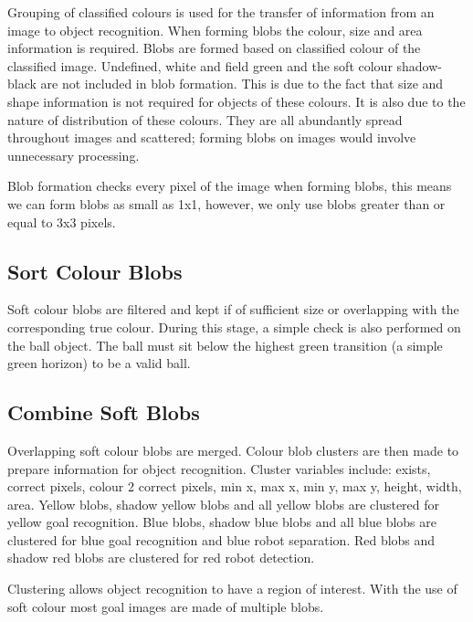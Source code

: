 Grouping of classified colours is used for the transfer of information from an image to object recognition. When forming blobs the colour, size and area information is required. Blobs are formed based on classified colour of the classified image. Undefined, white and field green and the soft colour shadow-black are not included in blob formation. This is due to the fact that size and shape information is not required for objects of these colours. It is also due to the nature of distribution of these colours. They are all abundantly spread throughout images and scattered; forming blobs on images would involve unnecessary processing. 

Blob formation checks every pixel of the image when forming blobs, this means we can form blobs as small as 1x1, however, we only use blobs greater than or equal to 3x3 pixels. 

\subsection{Sort Colour Blobs}

Soft colour blobs are filtered and kept if of sufficient size or overlapping with the corresponding true colour. During this stage, a simple check is also performed on the ball object. The ball must sit below the highest green transition (a simple green horizon) to be a valid ball.

\subsection{Combine Soft Blobs}

Overlapping soft colour blobs are merged. Colour blob clusters are then made to prepare information for object recognition. Cluster variables include: exists, correct pixels, colour 2 correct pixels, min x, max x, min y, max y, height, width, area. 
Yellow blobs, shadow yellow blobs and all yellow blobs are clustered for yellow goal recognition. Blue blobs, shadow blue blobs and all blue blobs are clustered for blue goal recognition and blue robot separation. Red blobs and shadow red blobs are clustered for red robot detection.

Clustering allows object recognition to have a region of interest. With the use of soft colour most goal images are made of multiple blobs.